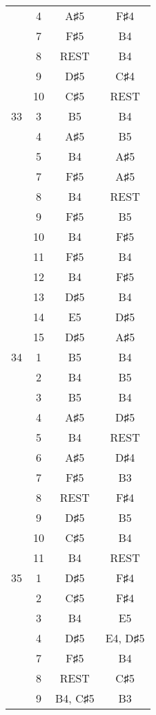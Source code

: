 \documentclass{article}
\begin{document}
\begin{longtable}{|c|c|c|c|}
  & 4 & A♯5 & F♯4 \\ 
  & 7 & F♯5 & B4 \\ 
  & 8 & REST & B4 \\ 
  & 9 & D♯5 & C♯4 \\ 
  & 10 & C♯5 & REST \\ 
\hline
33 & 3 & B5 & B4 \\ 
  & 4 & A♯5 & B5 \\ 
  & 5 & B4 & A♯5 \\ 
  & 7 & F♯5 & A♯5 \\ 
  & 8 & B4 & REST \\ 
  & 9 & F♯5 & B5 \\ 
  & 10 & B4 & F♯5 \\ 
  & 11 & F♯5 & B4 \\ 
  & 12 & B4 & F♯5 \\ 
  & 13 & D♯5 & B4 \\ 
  & 14 & E5 & D♯5 \\ 
  & 15 & D♯5 & A♯5 \\ 
\hline
34 & 1 & B5 & B4 \\ 
  & 2 & B4 & B5 \\ 
  & 3 & B5 & B4 \\ 
  & 4 & A♯5 & D♯5 \\ 
  & 5 & B4 & REST \\ 
  & 6 & A♯5 & D♯4 \\ 
  & 7 & F♯5 & B3 \\ 
  & 8 & REST & F♯4 \\ 
  & 9 & D♯5 & B5 \\ 
  & 10 & C♯5 & B4 \\ 
  & 11 & B4 & REST \\ 
\hline
35 & 1 & D♯5 & F♯4 \\ 
  & 2 & C♯5 & F♯4 \\ 
  & 3 & B4 & E5 \\ 
  & 4 & D♯5 & E4, D♯5 \\ 
  & 7 & F♯5 & B4 \\ 
  & 8 & REST & C♯5 \\ 
  & 9 & B4, C♯5 & B3 \\ 
\hline
\end{longtable}
\end{document}

